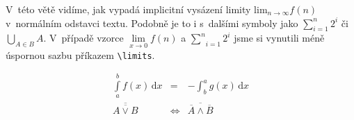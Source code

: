 \documentclass[a4paper,11pt,twocolumn]{article}
\theoremstyle{definition}
\theoremstyle{definition}
\theoremstyle{definition}
\begin{document}
V~této větě vidíme, jak vypadá implicitní vysázení limity $\mathrm{lim}_{n \rightarrow \infty}f(n)$ v~normálním odstavci textu. Podobně je to i s~dalšími symboly jako $\sum_{i=1}^n 2^i$ či $\bigcup_{A \in B}A$.
V~případě vzorce $\textstyle\lim\limits_{x \to 0} f(n)$ a $\underset{i = 1}{\overset{n}\sum} 2^i $ jsme si vynutili méně úspornou sazbu příkazem \verb|\limits|.

\begin{eqnarray}
\displaystyle \int \limits^b_a f(x)\, \mathrm{d}x &=&-\displaystyle\int^a_b g(x)\, \mathrm{d}x  \\
\overline{\overline{A \vee B}} &\Leftrightarrow& \overline{\overline{A} \wedge \overline{B}}
\end{eqnarray}
\end{document}
